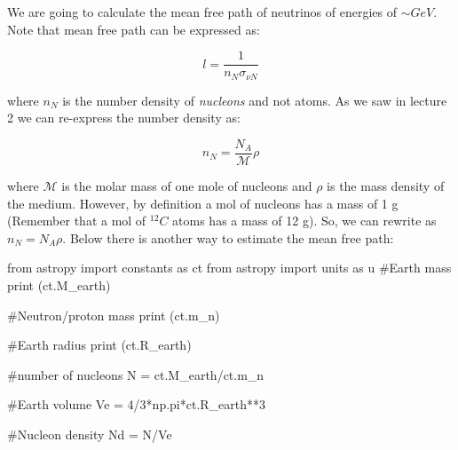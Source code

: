 \documentclass[
  letterpaper,
  DIV=11,
  numbers=noendperiod]{scrreprt}
\newenvironment{Shaded}{\begin{snugshade}}{\end{snugshade}}
\newcommand{\BuiltInTok}[1]{\textcolor[rgb]{0.00,0.23,0.31}{#1}}
\newcommand{\CommentTok}[1]{\textcolor[rgb]{0.37,0.37,0.37}{#1}}
\newcommand{\DecValTok}[1]{\textcolor[rgb]{0.68,0.00,0.00}{#1}}
\newcommand{\ImportTok}[1]{\textcolor[rgb]{0.00,0.46,0.62}{#1}}
\newcommand{\NormalTok}[1]{\textcolor[rgb]{0.00,0.23,0.31}{#1}}
\newcommand{\OperatorTok}[1]{\textcolor[rgb]{0.37,0.37,0.37}{#1}}
\begin{document}
\begin{tcolorbox}[enhanced jigsaw, colframe=quarto-callout-note-color-frame, leftrule=.75mm, left=2mm, opacitybacktitle=0.6, colbacktitle=quarto-callout-note-color!10!white, coltitle=black, arc=.35mm, titlerule=0mm, toprule=.15mm, opacityback=0, bottomrule=.15mm, breakable, bottomtitle=1mm, rightrule=.15mm, toptitle=1mm, colback=white, title=\textcolor{quarto-callout-note-color}{\faInfo}\hspace{0.5em}{Earth is transparent to GeV neutrinos}]

We are going to calculate the mean free path of neutrinos of energies of
\(\sim GeV\). Note that mean free path can be expressed as:

\[l = \frac{1}{n_N \sigma_{\nu N}}\]

where \(n_N\) is the number density of \emph{nucleons} and not atoms. As
we saw in lecture 2 we can re-express the number density as:

\[n_N = \frac{N_A}{\mathcal{M}}\rho\]

where \(\mathcal{M}\) is the molar mass of one mole of nucleons and
\(\rho\) is the mass density of the medium. However, by definition a mol
of nucleons has a mass of 1 g (Remember that a mol of \(^{12}C\) atoms
has a mass of 12 g). So, we can rewrite as \(n_N = N_A \rho\). Below
there is another way to estimate the mean free path:

\begin{Shaded}
\begin{Highlighting}[]
\ImportTok{from}\NormalTok{ astropy }\ImportTok{import}\NormalTok{ constants }\ImportTok{as}\NormalTok{ ct}
\ImportTok{from}\NormalTok{ astropy }\ImportTok{import}\NormalTok{ units }\ImportTok{as}\NormalTok{ u}
\CommentTok{\#Earth mass}
\BuiltInTok{print}\NormalTok{ (ct.M\_earth)}

\CommentTok{\#Neutron/proton mass}
\BuiltInTok{print}\NormalTok{ (ct.m\_n)}

\CommentTok{\#Earth radius}
\BuiltInTok{print}\NormalTok{ (ct.R\_earth)}

\CommentTok{\#number of nucleons}
\NormalTok{N }\OperatorTok{=}\NormalTok{ ct.M\_earth}\OperatorTok{/}\NormalTok{ct.m\_n }

\CommentTok{\#Earth volume}
\NormalTok{Ve }\OperatorTok{=} \DecValTok{4}\OperatorTok{/}\DecValTok{3}\OperatorTok{*}\NormalTok{np.pi}\OperatorTok{*}\NormalTok{ct.R\_earth}\OperatorTok{**}\DecValTok{3}

\CommentTok{\#Nucleon density}
\NormalTok{Nd }\OperatorTok{=}\NormalTok{ N}\OperatorTok{/}\NormalTok{Ve}


\end{Highlighting}
\end{Shaded}
\end{tcolorbox}
\end{document}
